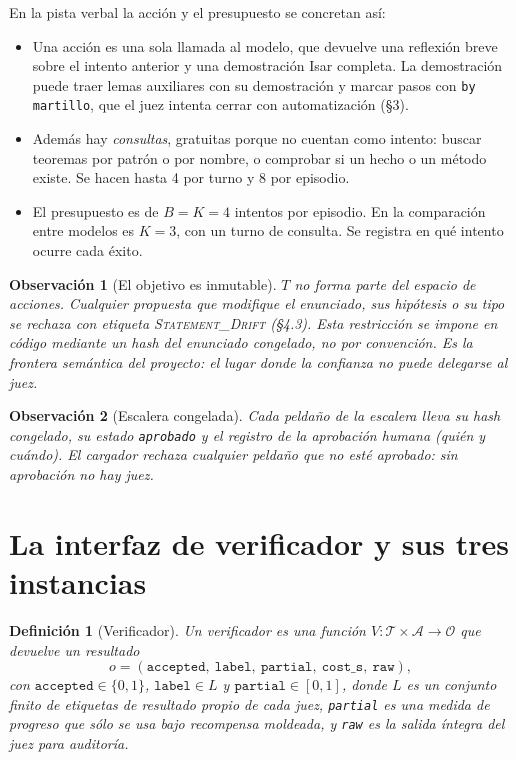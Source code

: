\documentclass[11pt,a4paper]{article}
\newtheorem{definition}{Definición}
\newtheorem{remark}{Observación}
\begin{document}
En la pista verbal la acción y el presupuesto se concretan así:
\begin{itemize}
  \item Una acción es una sola llamada al modelo, que devuelve una reflexión breve sobre el intento anterior y una demostración Isar completa. La demostración puede traer lemas auxiliares con su demostración y marcar pasos con \texttt{by martillo}, que el juez intenta cerrar con automatización (§3).
  \item Además hay \emph{consultas}, gratuitas porque no cuentan como intento: buscar teoremas por patrón o por nombre, o comprobar si un hecho o un método existe. Se hacen hasta 4 por turno y 8 por episodio.
  \item El presupuesto es de $B = K = 4$ intentos por episodio. En la comparación entre modelos es $K = 3$, con un turno de consulta. Se registra en qué intento ocurre cada éxito.
\end{itemize}

\begin{remark}[El objetivo es inmutable]
$T$ no forma parte del espacio de acciones. Cualquier propuesta que modifique el enunciado, sus hipótesis o su tipo se rechaza con etiqueta \textsc{Statement\_Drift} (§4.3). Esta restricción se impone en código mediante un hash del enunciado congelado, no por convención. Es la \emph{frontera semántica} del proyecto: el lugar donde la confianza no puede delegarse al juez.
\end{remark}

\begin{remark}[Escalera congelada]
Cada peldaño de la escalera lleva su hash congelado, su estado \texttt{aprobado} y el registro de la aprobación humana (quién y cuándo). El cargador rechaza cualquier peldaño que no esté aprobado: sin aprobación no hay juez.
\end{remark}

\section{La interfaz de verificador y sus tres instancias}

\begin{definition}[Verificador]
Un verificador es una función $V : \mathcal{T} \times \mathcal{A} \to \mathcal{O}$ que devuelve un \emph{resultado}
\[
  o = (\texttt{accepted},\ \texttt{label},\ \texttt{partial},\ \texttt{cost\_s},\ \texttt{raw}),
\]
con $\texttt{accepted}\in\{0,1\}$, $\texttt{label}\in L$ y $\texttt{partial}\in[0,1]$,
donde $L$ es un conjunto finito de etiquetas de resultado propio de cada juez, \texttt{partial} es una medida de progreso que sólo se usa bajo recompensa moldeada, y \texttt{raw} es la salida íntegra del juez para auditoría.
\end{definition}
\end{document}

